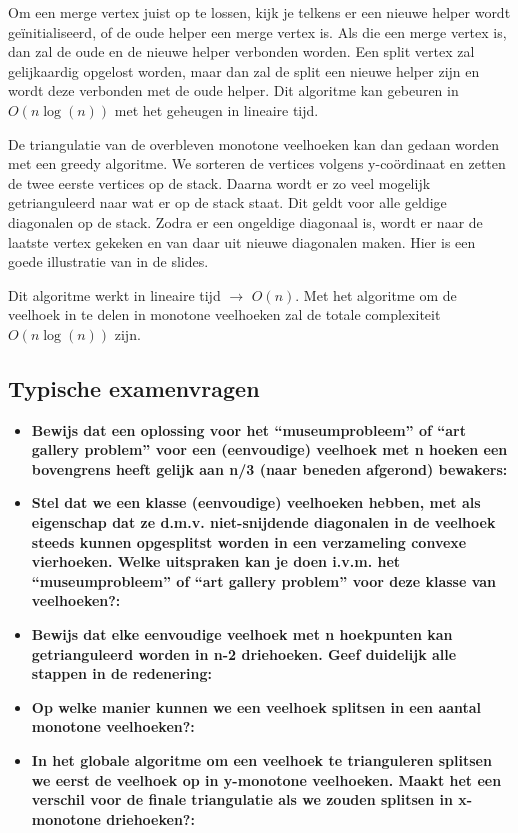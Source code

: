\documentclass[12pt,a4paper]{article}
\begin{document}
	Om een merge vertex juist op te lossen, kijk je telkens er een nieuwe helper wordt geïnitialiseerd, of de oude helper een merge vertex is. Als die een merge vertex is, dan zal de oude en de nieuwe helper verbonden worden. Een split vertex zal gelijkaardig opgelost worden, maar dan zal de split een nieuwe helper zijn en wordt deze verbonden met de oude helper. Dit algoritme kan gebeuren in $O(n\log(n))$ met het geheugen in lineaire tijd. 
	
	De triangulatie van de overbleven monotone veelhoeken kan dan gedaan worden met een greedy algoritme. We sorteren de vertices volgens y-coördinaat en zetten de twee eerste vertices op de stack. Daarna wordt er zo veel mogelijk getrianguleerd naar wat er op de stack staat. Dit geldt voor alle geldige diagonalen op de stack. Zodra er een ongeldige diagonaal is, wordt er naar de laatste vertex gekeken en van daar uit nieuwe diagonalen maken. Hier is een goede illustratie van in de slides. 
	
	Dit algoritme werkt in lineaire tijd $\rightarrow$ $O(n)$. Met het algoritme om de veelhoek in te delen in monotone veelhoeken zal de totale complexiteit $O(n\log(n))$ zijn. 
	
	
	\subsection{Typische examenvragen}
	\begin{itemize}
		\item \textbf{Bewijs dat een oplossing voor het “museumprobleem” of “art gallery problem” voor een (eenvoudige) veelhoek met n hoeken een bovengrens heeft gelijk aan  n/3 (naar beneden afgerond) bewakers:}\\
		\item \textbf{Stel dat we een klasse (eenvoudige) veelhoeken hebben, met als eigenschap dat ze d.m.v. niet-snijdende diagonalen in de veelhoek steeds kunnen opgesplitst worden in een verzameling convexe vierhoeken. Welke uitspraken kan je doen i.v.m. het “museumprobleem” of “art gallery problem” voor deze klasse van veelhoeken?:}\\
		\item \textbf{Bewijs dat elke eenvoudige veelhoek met n hoekpunten kan getrianguleerd worden in n-2 driehoeken. Geef duidelijk alle stappen in de redenering:}\\
		\item \textbf{Op welke manier kunnen we een veelhoek splitsen in een aantal monotone veelhoeken?:}\\
		\item \textbf{In het globale algoritme om een veelhoek te trianguleren splitsen we eerst de veelhoek op in y-monotone veelhoeken. Maakt het een verschil voor de finale triangulatie als we zouden splitsen in x-monotone driehoeken?:}\\
	\end{itemize}
	
\end{document}

